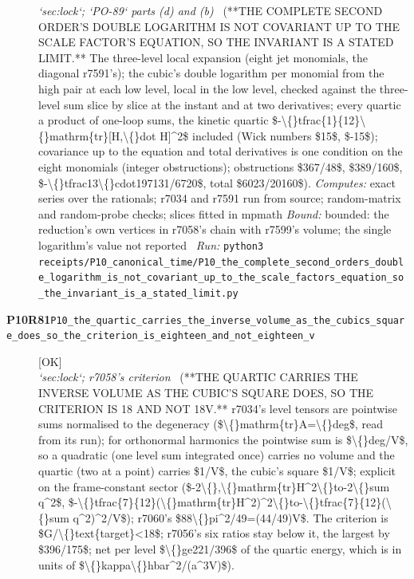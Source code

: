 \begin{description}
\textit{`sec:lock`; `PO-89` parts (d) and (b)} \ (**THE COMPLETE SECOND ORDER'S DOUBLE LOGARITHM IS NOT COVARIANT UP TO THE SCALE FACTOR'S EQUATION, SO THE INVARIANT IS A STATED LIMIT.** The three-level local expansion (eight jet monomials, the diagonal r7591's); the cubic's double logarithm per monomial from the high pair at each low level, local in the low level, checked against the three-level sum slice by slice at the instant and at two derivatives; every quartic a product of one-loop sums, the kinetic quartic \$-\textbackslash\{\}tfrac\{1\}\{12\}\textbackslash\{\}mathrm\{tr\}[H,\textbackslash\{\}dot H]\textasciicircum{}2\$ included (Wick numbers \$15\$, \$-15\$); covariance up to the equation and total derivatives is one condition on the eight monomials (integer obstructions); obstructions \$367/48\$, \$389/160\$, \$-\textbackslash\{\}tfrac13\textbackslash\{\}cdot197131/6720\$, total \$6023/20160\$). 
\emph{Computes:} exact series over the rationals; r7034 and r7591 run from source; random-matrix and random-probe checks; slices fitted in mpmath
 \emph{Bound:} bounded: the reduction's own vertices in r7058's chain with r7599's volume; the single logarithm's value not reported
\ \emph{Run:} \texttt{python3 receipts/P10\_canonical\_time/P10\_the\_complete\_second\_orders\_double\_logarithm\_is\_not\_covariant\_up\_to\_the\_scale\_factors\_equation\_so\_the\_invariant\_is\_a\_stated\_limit.py}
\item[\rcptlabel{P10_the_quartic_carries_the_inverse_volume_as_the_cubics_square_does_so_the_criterion_is_eighteen_and_not_eighteen_v}{P10R81}\textbf{P10R81}\quad\texttt{P10\_the\_quartic\_carries\_the\_inverse\_volume\_as\_the\_cubics\_square\_does\_so\_the\_criterion\_is\_eighteen\_and\_not\_eighteen\_v}]\hfill\textsf{[OK]}\\
\textit{`sec:lock`; r7058's criterion} \ (**THE QUARTIC CARRIES THE INVERSE VOLUME AS THE CUBIC'S SQUARE DOES, SO THE CRITERION IS 18 AND NOT 18V.** r7034's level tensors are pointwise sums normalised to the degeneracy (\$\textbackslash\{\}mathrm\{tr\}A=\textbackslash\{\}deg\$, read from its run); for orthonormal harmonics the pointwise sum is \$\textbackslash\{\}deg/V\$, so a quadratic (one level sum integrated once) carries no volume and the quartic (two at a point) carries \$1/V\$, the cubic's square \$1/V\$; explicit on the frame-constant sector (\$-2\textbackslash\{\},\textbackslash\{\}mathrm\{tr\}H\textasciicircum{}2\textbackslash\{\}to-2\textbackslash\{\}sum q\textasciicircum{}2\$, \$-\textbackslash\{\}tfrac\{7\}\{12\}(\textbackslash\{\}mathrm\{tr\}H\textasciicircum{}2)\textasciicircum{}2\textbackslash\{\}to-\textbackslash\{\}tfrac\{7\}\{12\}(\textbackslash\{\}sum q\textasciicircum{}2)\textasciicircum{}2/V\$); r7060's \$88\textbackslash\{\}pi\textasciicircum{}2/49=(44/49)V\$. The criterion is \$G/\textbackslash\{\}text\{target\}<18\$; r7056's six ratios stay below it, the largest by \$396/175\$; net per level \$\textbackslash\{\}ge221/396\$ of the quartic energy, which is in units of \$\textbackslash\{\}kappa\textbackslash\{\}hbar\textasciicircum{}2/(a\textasciicircum{}3V)\$). 

\end{description}
